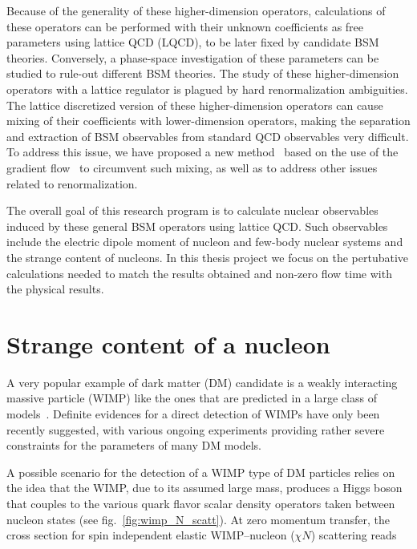 \documentclass[aps,prc,twocolumn,showpacs,floatfix,nofootinbib,preprintnumbers,superscriptaddress,amsmath,amssymb]{revtex4-1}
\begin{document}
Because of the generality of these higher-dimension operators, 
calculations of these operators can be performed with their unknown coefficients as free parameters using lattice QCD (LQCD), 
to be later fixed by candidate BSM theories.  
Conversely, a phase-space investigation of these parameters can be studied to rule-out different BSM theories.  
The study of these higher-dimension operators with a lattice regulator is plagued by 
hard renormalization ambiguities. 
The lattice discretized version of these higher-dimension operators can cause mixing of their coefficients 
with lower-dimension operators, making the separation and extraction of BSM observables from standard QCD observables very difficult.  
To address this issue, we have proposed a new method~\cite{Shindler:2014oha,Shindler:2015aqa} 
based on the use of the gradient flow~\cite{Luscher:2010iy,Luscher:2013cpa} 
to circumvent such mixing, as well as to address other issues related to renormalization.

The overall goal of this research program is to calculate nuclear observables induced by these general BSM operators using lattice QCD.  
Such observables include the electric dipole moment of nucleon and few-body nuclear systems
and the strange content of nucleons. 
In this thesis project we focus on the pertubative calculations needed 
to match the results obtained and non-zero flow time with the physical results.

\section*{Strange content of a nucleon}

A very popular example of dark matter (DM) candidate is a  
weakly interacting massive particle (WIMP) like the ones that are predicted in 
a large class of models~\cite{Bertone:2004pz}.
Definite evidences for a direct detection of WIMPs have only been recently suggested, with various ongoing experiments providing rather severe constraints for the parameters of many DM models. 

A possible scenario for the detection of a WIMP type of DM particles relies on the idea  
that the WIMP, due to its assumed large mass, produces a Higgs boson 
that couples to the various quark flavor scalar density operators taken
between nucleon states (see fig.~\ref{fig:wimp_N_scatt}). 
At zero momentum transfer, the cross section for spin independent elastic WIMP--nucleon ($\chi N$) 
scattering reads \cite{Ellis:2008hf}
\end{document}
